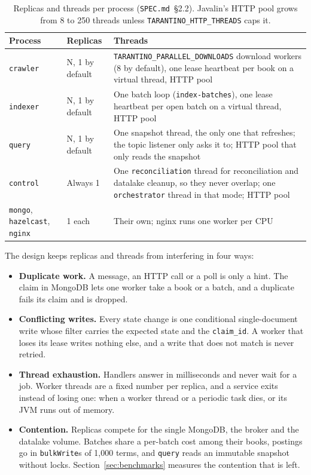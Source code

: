 \documentclass[11pt,a4paper]{article}
\newcommand{\code}[1]{\nolinkurl{#1}}
\newcommand{\spec}[1]{\code{SPEC.md}~\S#1}
\begin{document}
\begin{table}[ht]
\centering
\small
\caption{Replicas and threads per process (\spec{2.2}). Javalin's HTTP pool grows from 8 to 250 threads unless
\code{TARANTINO_HTTP_THREADS} caps it.}
\label{tab:threads}
\begin{tabularx}{\textwidth}{@{}llX@{}}
\toprule
Process & Replicas & Threads \\
\midrule
\code{crawler} & N, 1 by default & \code{TARANTINO_PARALLEL_DOWNLOADS} download workers (8 by default), one lease heartbeat per book on a virtual thread, HTTP pool \\
\code{indexer} & N, 1 by default & One batch loop (\code{index-batches}), one lease heartbeat per open batch on a virtual thread, HTTP pool \\
\code{query} & N, 1 by default & One snapshot thread, the only one that refreshes; the topic listener only asks it to; HTTP pool that only reads the snapshot \\
\code{control} & Always 1 & One \code{reconciliation} thread for reconciliation and datalake cleanup, so they never overlap; one \code{orchestrator} thread in that mode; HTTP pool \\
\code{mongo}, \code{hazelcast}, \code{nginx} & 1 each & Their own; nginx runs one worker per CPU \\
\bottomrule
\end{tabularx}
\end{table}

The design keeps replicas and threads from interfering in four ways:
\begin{itemize}
\item \textbf{Duplicate work.} A message, an HTTP call or a poll is only a hint. The claim in MongoDB lets one worker
  take a book or a batch, and a duplicate fails its claim and is dropped.
\item \textbf{Conflicting writes.} Every state change is one conditional single-document write whose filter carries
  the expected state and the \code{claim_id}. A worker that loses its lease writes nothing else, and a write that does
  not match is never retried.
\item \textbf{Thread exhaustion.} Handlers answer in milliseconds and never wait for a job. Worker threads are a fixed
  number per replica, and a service exits instead of losing one: when a worker thread or a periodic task dies, or its
  JVM runs out of memory.
\item \textbf{Contention.} Replicas compete for the single MongoDB, the broker and the datalake volume. Batches share a
  per-batch cost among their books, postings go in \code{bulkWrite}s of 1{,}000 terms, and \code{query} reads an
  immutable snapshot without locks. Section~\ref{sec:benchmarks} measures the contention that is left.
\end{itemize}
\end{document}

